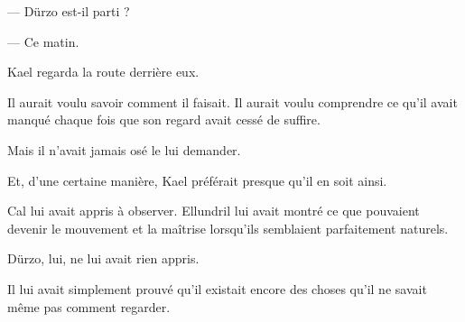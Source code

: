 — Dürzo est-il parti ?

— Ce matin.

Kael regarda la route derrière eux.

Il aurait voulu savoir comment il faisait. Il aurait voulu comprendre ce qu'il
avait manqué chaque fois que son regard avait cessé de suffire.

Mais il n'avait jamais osé le lui demander.

Et, d'une certaine manière, Kael préférait presque qu'il en soit ainsi.

Cal lui avait appris à observer. Ellundril lui avait montré ce que pouvaient
devenir le mouvement et la maîtrise lorsqu'ils semblaient parfaitement
naturels.

Dürzo, lui, ne lui avait rien appris.

Il lui avait simplement prouvé qu'il existait encore des choses qu'il ne savait
même pas comment regarder.